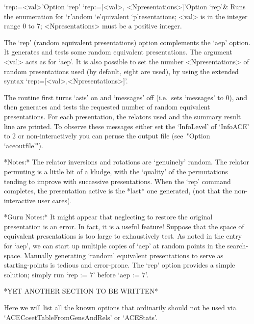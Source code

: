 \beginitems

\>`rep:=<val>'{Option `rep'}
\>`rep:=[<val>, <Npresentations>]'{Option `rep'}&
Runs  the enumeration for `r'andom `e'quivalent `p'resentations;
<val> is in the integer range 0 to 7;
<Npresentations> must be a positive integer.

\enditems

The `rep' (random equivalent  presentations)  option  complements  the
`aep'  option.  It  generates  and  tests   some   random   equivalent
presentations. The argument <val>  acts  as  for  `aep'.  It  is  also
possible to set the number <Npresentations>  of  random  presentations
used (by default, eight  are  used),  by  using  the  extended  syntax
`rep:=[<val>,<Npresentations>]'.

The routine first  turns  `asis'  on  and  `messages'  off  (i.e.~sets
`messages' to 0), and then generates and tests the requested number of
random equivalent presentations. For each presentation,  the  relators
used and the  summary  result  line  are  printed.  To  observe  these
messages  either  set  the  `InfoLevel'   of   `InfoACE'   to   2   or
non-interactively you can peruse the {\ACE} output  file  (see~"Option
`aceoutfile'").

*Notes:*
The relator inversions and rotations are \lq{}genuinely'  random.  The
relator permuting is a little bit of a kludge, with the  \lq{}quality'
of the permutations tending to improve with successive  presentations.
When the `rep' command  completes,  the  presentation  active  is  the
*last* one generated, (not that the non-interactive user cares).

*Guru Notes:*
It might appear that neglecting to restore the  original  presentation
is an error. In fact, it is a useful feature! Suppose that  the  space
of equivalent presentations is too  large  to  exhaustively  test.  As
noted in the entry for `aep', we can start up multiple copies of `aep'
at random points in the  search-space.  Manually  generating  `random'
equivalent presentations to serve as starting-points  is  tedious  and
error-prone. The `rep' option provides a simple solution;  simply  run
`rep := 7' before `aep := 7'.


*YET ANOTHER SECTION TO BE WRITTEN*

Here we will list all the known {\ACE} options that ordinarily  should
not be used via `ACECosetTableFromGensAndRels' or `ACEStats'.


